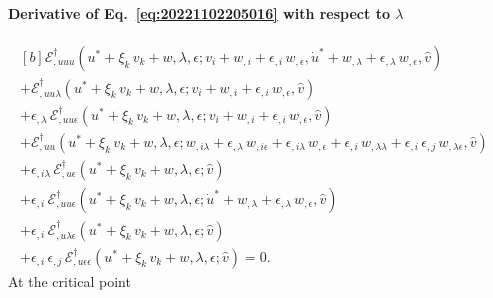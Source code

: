 \documentclass[12pt, final]{scrartcl}
\theoremstyle{definition}
\newcommand{\E}{\mathcal E}
\newcommand{\EE}{\mathcal E ^ \dagger}
\begin{document}
\paragraph{Derivative of Eq.~\eqref{eq:20221102205016} with respect to \(\lambda\)}
\begin{equation}
  \begin{aligned}[b]
    \EE_{,uuu}(u^\ast + \xi_k \, v_k + w, \lambda, \epsilon; v_i + w_{,i} + \epsilon_{,i} \, w_{,\epsilon}, \dot{u}^\ast + w_{,\lambda} + \epsilon_{,\lambda} \, w_{,\epsilon}, \hat{v})&\\
    + \EE_{,uu\lambda}(u^\ast + \xi_k \, v_k + w, \lambda, \epsilon; v_i + w_{,i} + \epsilon_{,i} \, w_{,\epsilon}, \hat{v})&\\
    + \epsilon_{,\lambda} \, \EE_{,uu\epsilon}(u^\ast + \xi_k \, v_k + w, \lambda, \epsilon; v_i + w_{,i} + \epsilon_{,i} \, w_{,\epsilon}, \hat{v})&\\
    + \EE_{,uu}(u^\ast + \xi_k \, v_k + w, \lambda, \epsilon;  w_{,i\lambda} + \epsilon_{,\lambda} \, w_{,i\epsilon} + \epsilon_{,i\lambda} \, w_{,\epsilon} + \epsilon_{,i} \, w_{,\lambda\lambda} + \epsilon_{,i} \, \epsilon_{,j} \, w_{,\lambda\epsilon} , \hat{v})&\\
    + \epsilon_{,i\lambda} \, \EE_{,u\epsilon}(u^\ast + \xi_k \, v_k + w, \lambda, \epsilon; \hat{v})&\\
    + \epsilon_{,i} \, \EE_{,uu\epsilon}(u^\ast + \xi_k \, v_k + w, \lambda, \epsilon; \dot{u}^\ast + w_{,\lambda} + \epsilon_{,\lambda} \, w_{,\epsilon}, \hat{v}) &\\
    + \epsilon_{,i} \, \EE_{,u\lambda\epsilon}(u^\ast + \xi_k \, v_k + w, \lambda, \epsilon; \hat{v}) &\\
    + \epsilon_{,i} \, \epsilon_{,j} \, \EE_{,u\epsilon\epsilon}(u^\ast + \xi_k \, v_k + w, \lambda, \epsilon; \hat{v}) = 0.
  \end{aligned}
\end{equation}
At the critical point
\end{document}
